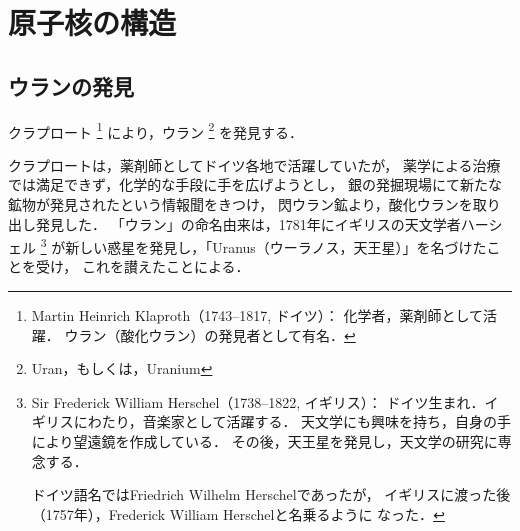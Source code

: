 
    \section{原子核の構造}
        \subsection{ウランの発見}
            クラプロート
                \footnote{
                    Martin Heinrich Klaproth（1743--1817, ドイツ）：
                    化学者，薬剤師として活躍．
                    ウラン（酸化ウラン）の発見者として有名．
                }
            により，ウラン
                \footnote{
                    Uran，もしくは，Uranium
                }
            を発見する．

            クラプロートは，薬剤師としてドイツ各地で活躍していたが，
            薬学による治療では満足できず，化学的な手段に手を広げようとし，
            銀の発掘現場にて新たな鉱物が発見されたという情報聞をきつけ，
            閃ウラン鉱より，酸化ウランを取り出し発見した．
            「ウラン」の命名由来は，1781年にイギリスの天文学者ハーシェル
                \footnote{
                    Sir Frederick William Herschel（1738--1822, イギリス）：
                    ドイツ生まれ．イギリスにわたり，音楽家として活躍する．
                    天文学にも興味を持ち，自身の手により望遠鏡を作成している．
                    その後，天王星を発見し，天文学の研究に専念する．

                    ドイツ語名ではFriedrich Wilhelm Herschelであったが，
                    イギリスに渡った後（1757年），Frederick William Herschelと名乗るように
                    なった．
                }
            が新しい惑星を発見し，「Uranus（ウーラノス，天王星）」を名づけたことを受け，
            これを讃えたことによる．

